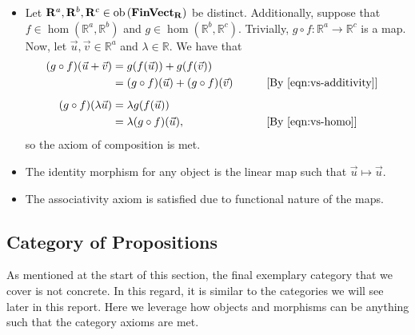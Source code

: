 \begin{itemize}
        \item Let $\mathbf{R} ^a, \mathbf{R} ^b, \mathbf{R} ^c \in
                \operatorname{ob}{(\operatorname{\mathbf{FinVect}_\mathbf{R}})}$ be distinct. Additionally, suppose that
                $f \in \hom ( \mathbb{R} ^a, \mathbb{R} ^b)$ and
                $g \in \hom ( \mathbb{R} ^b, \mathbb{R} ^c)$.
                Trivially, $g \circ f \colon \mathbb{R} ^a \to \mathbb{R} ^c$
                is a map. Now, let $\vec{u} , \vec{v} \in \mathbb{R} ^a$
                and $\lambda \in \mathbb{R}$. We have that
                \begingroup
                \renewcommand{\equationautorefname}{Eqn.}
                \begin{alignat}{2}
                        (g \circ f)( \vec{u} + \vec{v} )
                        &= g(f( \vec{u} )) + g(f( \vec{v} ))\nonumber \\
                        &= (g \circ f)( \vec{u} ) + (g \circ f)( \vec{v} )
                        \qquad&&\text{[By \autoref{eqn:vs-additivity}]} \\[.5em]
                        (g \circ f)( \lambda \vec{u} )
                        &= \lambda g(f( \vec{u} ))\nonumber \\
                        &= \lambda (g \circ f)( \vec{u} ),
                        \qquad&&\text{[By \autoref{eqn:vs-homo}]}
                \end{alignat}
                \endgroup
                so the axiom of composition is met.
        \item The identity morphism for any object is the linear map such that
                $\vec{u} \mapsto \vec{u}$.
        \item The associativity axiom is satisfied due to functional nature of
                the maps.
\end{itemize}

\subsection{Category of Propositions}
As mentioned at the start of this section, the final exemplary category that we
cover is not concrete. In this regard, it is similar to the categories we will
see later in this report. Here we leverage how objects and morphisms can be
anything such that the category axioms are met.

